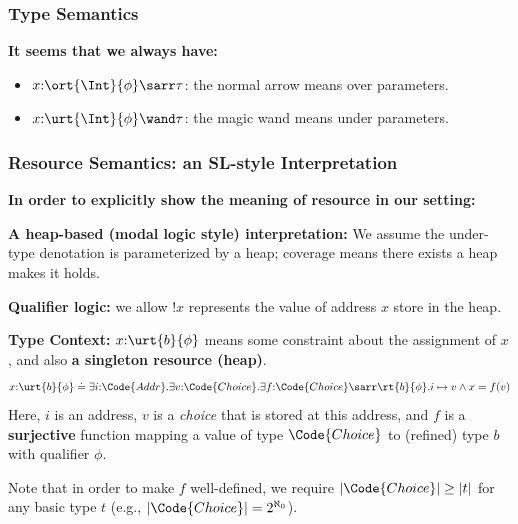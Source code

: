 \begin{frame}
    \frametitle{Type Semantics}

\textbf{It seems that we always have:}

\begin{itemize}
    \item $x{:}\ort{\Int}{\phi}\sarr\tau$: the normal arrow means over parameters.
    \item $x{:}\urt{\Int}{\phi}\wand\tau$: the magic wand means under parameters.
\end{itemize}
    
\end{frame} 

\begin{frame}[fragile]
    \frametitle{Resource Semantics: an SL-style Interpretation}

    \textbf{In order to explicitly show the meaning of resource in our setting:}

\textbf{A heap-based (modal logic style) interpretation:} We assume the under-type denotation is parameterized by a heap; coverage means there exists a heap makes it holds.

\textbf{Qualifier logic:} we allow $!x$ represents the value of address $x$ store in the heap.

\textbf{Type Context:} $x{:}\urt{b}{\phi}$ means some constraint about the assignment of $x$, and also \textbf{a singleton resource (heap)}.
\begin{align*}
    x{:}\urt{b}{\phi} \doteq \exists i{:}\Code{Addr}.\exists v{:}\Code{Choice}.\exists f{:}\Code{Choice}\sarr \rt{b}{\phi}. i\mapsto v \land x = f(v)
\end{align*}
Here, $i$ is an address, $v$ is a \emph{choice} that is stored at this address, and $f$ is a \textbf{surjective} function mapping a value of type $\Code{Choice}$ to (refined) type $b$ with qualifier $\phi$. 

Note that in order to make $f$ well-defined, we require $|\Code{Choice}| \geq |t|$ for any basic type $t$ (e.g., $|\Code{Choice}| = 2^{\aleph_0}$).

\end{frame}

